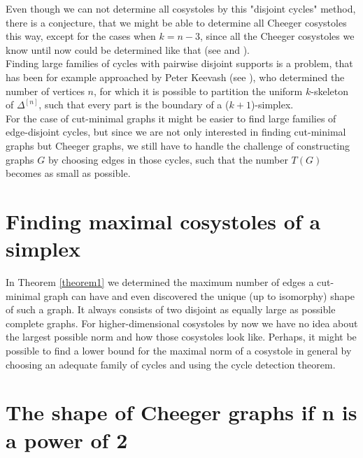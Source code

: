 

Even though we can not determine all cosystoles by this "disjoint cycles" method, there is a conjecture, that we might be able to determine all Cheeger cosystoles this way, except for the cases when \(k=n-3\), since all the Cheeger cosystoles we know until now could be determined like that (see \cite{1} and \cite{6}).\\
Finding large families of cycles with pairwise disjoint supports is a problem, that has been for example approached by Peter Keevash (see \cite{11}), who determined the number of vertices \(n\), for which it is possible to partition the uniform \(k\)-skeleton of \(\Delta^{[n]}\), such that every part is the boundary of a (\(k+1\))-simplex.\\
For the case of cut-minimal graphs it might be easier to find large families of edge-disjoint cycles, but since we are not only interested in finding cut-minimal graphs but Cheeger graphs, we still have to handle the challenge of constructing graphs \(G\) by choosing edges in those cycles, such that the number \(T(G)\) becomes as small as possible.

\section{Finding maximal cosystoles of a simplex}

In Theorem \ref{theorem1} we determined the maximum number of edges a cut-minimal graph can have and even discovered the unique (up to isomorphy) shape of such a graph. It always consists of two disjoint as equally large as possible complete graphs. For higher-dimensional cosystoles by now we have no idea about the largest possible norm and how those cosystoles look like. Perhaps, it might be possible to find a lower bound for the maximal norm of a cosystole in general by choosing an adequate family of cycles and using the cycle detection theorem.

\section{The shape of Cheeger graphs if n is a power of 2}

